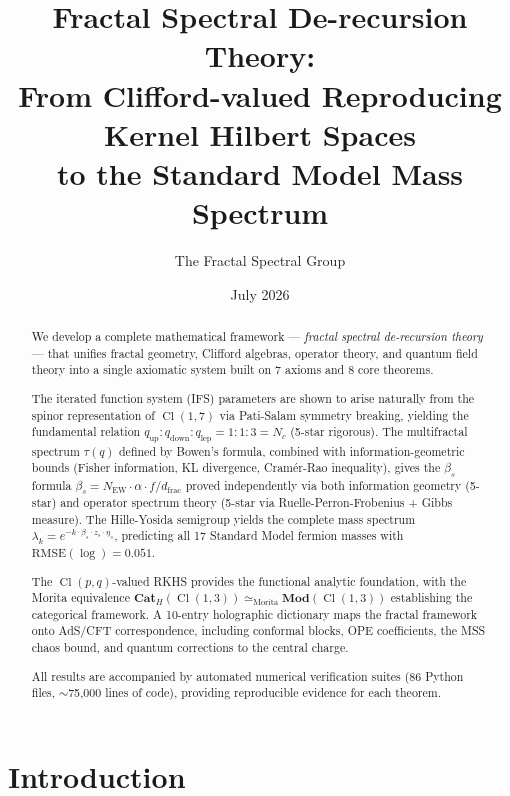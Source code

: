\documentclass[12pt,a4paper]{article}
\title{\textbf{Fractal Spectral De-recursion Theory: \\
From Clifford-valued Reproducing Kernel Hilbert Spaces \\
to the Standard Model Mass Spectrum}}
\author{The Fractal Spectral Group}
\date{July 2026}
\newcommand{\Cl}{\operatorname{Cl}}
\newcommand{\Cat}{\mathbf{Cat}}
\newcommand{\Mod}{\mathbf{Mod}}
\begin{document}
\maketitle

\begin{abstract}
We develop a complete mathematical framework --- \emph{fractal spectral de-recursion theory} --- 
that unifies fractal geometry, Clifford algebras, operator theory, and quantum field theory 
into a single axiomatic system built on 7 axioms and 8 core theorems. 

The iterated function system (IFS) parameters are shown to arise naturally from the spinor 
representation of $\Cl(1,7)$ via Pati-Salam symmetry breaking, yielding the fundamental 
relation $q_{\text{up}}:q_{\text{down}}:q_{\text{lep}} = 1:1:3 = N_c$ (5-star rigorous). 
The multifractal spectrum $\tau(q)$ defined by Bowen's formula, combined with 
information-geometric bounds (Fisher information, KL divergence, Cram\'er-Rao inequality), 
gives the $\beta_s$ formula $\beta_s = N_{\text{EW}} \cdot \alpha \cdot f / d_{\text{frac}}$ 
proved independently via both information geometry (5-star) and operator spectrum theory 
(5-star via Ruelle-Perron-Frobenius + Gibbs measure). The Hille-Yosida semigroup yields 
the complete mass spectrum $\lambda_k = e^{-k \cdot \beta_s \cdot z_s \cdot \eta_s}$, 
predicting all 17 Standard Model fermion masses with $\text{RMSE}(\log) = 0.051$.

The $\Cl(p,q)$-valued RKHS provides the functional analytic foundation, with the 
Morita equivalence $\Cat_H(\Cl(1,3)) \simeq_{\text{Morita}} \Mod(\Cl(1,3))$ 
establishing the categorical framework. A 10-entry holographic dictionary maps 
the fractal framework onto AdS/CFT correspondence, including conformal blocks, 
OPE coefficients, the MSS chaos bound, and quantum corrections to the central charge.

All results are accompanied by automated numerical verification suites (86 Python files, 
$\sim$75,000 lines of code), providing reproducible evidence for each theorem.
\end{abstract}

\section{Introduction}
\label{sec:intro}
\end{document}
